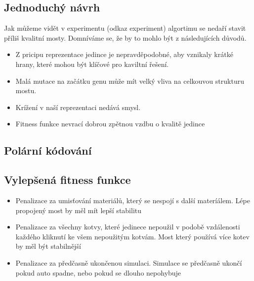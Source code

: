 

\subsection{Jednoduchý návrh}



Jak můžeme vidět v experimentu (odkaz experiment) algortimu se nedaří stavit příliš kvalitní mosty. Domníváme se, že by to mohlo být z následujících důvodů.

\begin{itemize}
    \item Z pricipu reprezentace jedince je nepravděpodobné, aby vznikaly krátké hrany, které mohou být klíčové pro kaviltní řešení.
    \item Malá mutace na začátku genu může mít velký vliva na celkouvou strukturu mostu.
    \item Krížení v naší reprezentaci nedává smysl.
    \item Fitness funkce nevrací dobrou zpětnou vzdbu o kvalitě jedince 
\end{itemize}

\subsection{Polární kódování}


\subsection{Vylepšená fitness funkce}


\begin{itemize}
    \item Penalizace za umisťování materiálů, který se nespojí s další materíálem. Lépe propojený most by měl mít lepší stabilitu
    \item Penalizace za všechny kotvy, které jedinece nepoužil v podobě vzdálenosti každého kliknutí ke všem nepoužitým kotvám. Most který používá více kotev by měl být stabilnější
    \item Penalizace za předčasně ukončenou simulaci. Simulace se předčasně ukončí pokud auto spadne, nebo pokud se dlouho nepohybuje
\end{itemize}

